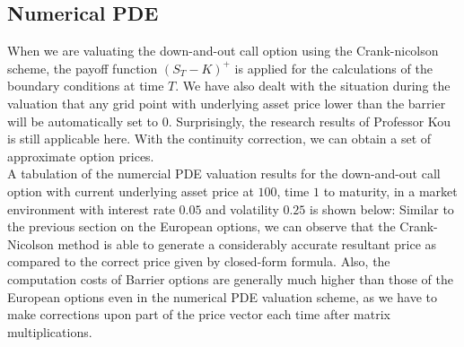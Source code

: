 \subsection*{Numerical PDE}
When we are valuating the down-and-out call option using the Crank-nicolson scheme, the payoff function $(S_{T} - K)^{+}$ is applied for the calculations of the boundary conditions at time $T$. We have also dealt with the situation during the valuation that any grid point with underlying asset price lower than the barrier will be automatically set to $0$. Surprisingly, the research results of Professor Kou\cite{ContinuityCorrection} is still applicable here. With the continuity correction, we can obtain a set of approximate option prices.\\[1mm]
A tabulation of the numercial PDE valuation results for the down-and-out call option with current underlying asset price at $100$, time $1$ to maturity, in a market environment with interest rate $0.05$ and volatility $0.25$ is shown below:
Similar to the previous section on the European options, we can observe that the Crank-Nicolson method is able to generate a considerably accurate resultant price as compared to the correct price given by closed-form formula. Also, the computation costs of Barrier options are generally much higher than those of the European options even in the numerical PDE valuation scheme, as we have to make corrections upon part of the price vector each time after matrix multiplications.

